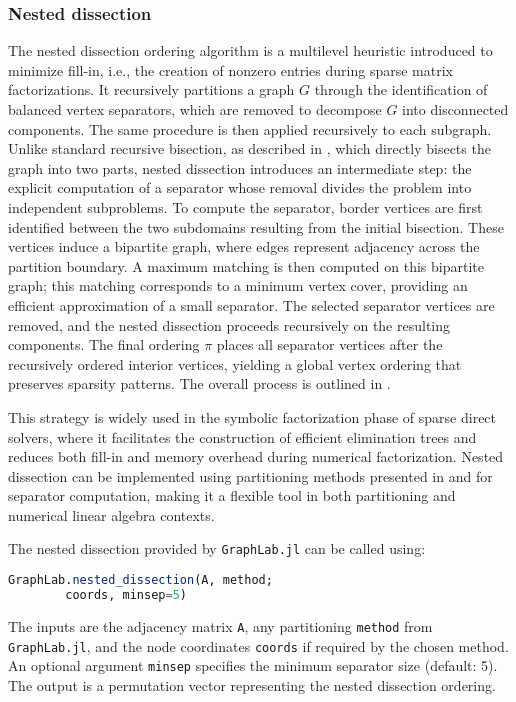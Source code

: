 \documentclass[../paper.tex]{subfiles}
\begin{document}
    \subsubsection{Nested dissection}
    The nested dissection ordering algorithm is a multilevel heuristic introduced to minimize fill-in, i.e., the creation of nonzero entries during sparse matrix factorizations\cite{George73}.
    It recursively partitions a graph $G$ through the identification of balanced vertex separators, which are removed to decompose $G$ into disconnected components. The same procedure is then applied recursively to each subgraph.
    Unlike standard recursive bisection, as described in , which directly bisects the graph into two parts, nested dissection introduces an intermediate step: the explicit computation of a separator whose removal divides the problem into independent subproblems.
    To compute the separator, border vertices are first identified between the two subdomains resulting from the initial bisection. These vertices induce a bipartite graph, where edges represent adjacency across the partition boundary. A maximum matching is then computed on this bipartite graph; this matching corresponds to a minimum vertex cover\cite{turner2020mappingmatchingsminimumvertex, storer2012introduction}, providing an efficient approximation of a small separator. The selected separator vertices are removed, and the nested dissection proceeds recursively on the resulting components.
    The final ordering $\pi$ places all separator vertices after the recursively ordered interior vertices, yielding a global vertex ordering that preserves sparsity patterns. The overall process is outlined in .

    This strategy is widely used in the symbolic factorization phase of sparse direct solvers, where it facilitates the construction of efficient elimination trees and reduces both fill-in and memory overhead during numerical factorization.
    Nested dissection can be implemented using partitioning methods presented in  and  for separator computation, making it a flexible tool in both partitioning and numerical linear algebra contexts.

    

    The nested dissection provided by \texttt{GraphLab.jl} can be called using:

    \begin{lstlisting}[language=Julia]
    GraphLab.nested_dissection(A, method; 
        coords, minsep=5)
    \end{lstlisting}

    The inputs are the adjacency matrix \texttt{A}, any partitioning \texttt{method} from \texttt{GraphLab.jl}, and the node coordinates \texttt{coords} if required by the chosen method. An optional argument \texttt{minsep} specifies the minimum separator size (default: 5). The output is a permutation vector representing the nested dissection ordering.
    
\end{document}

